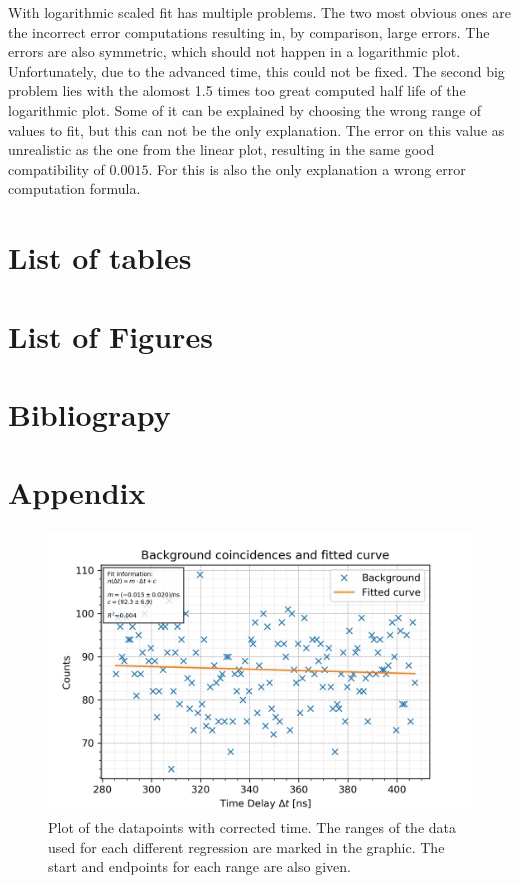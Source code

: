 \documentclass[30pt,a4paper]{article}
\begin{document}
 	With logarithmic scaled fit has multiple problems. The two most obvious ones are
 	the incorrect error computations resulting in, by comparison, large errors. The
 	errors are also symmetric, which should not happen in a logarithmic plot. 
 	Unfortunately, due to the advanced time, this could not be fixed.
 	The second big problem lies with the alomost 1.5 times too great computed half life of the logarithmic plot. Some of it can be explained by choosing the wrong range of values to fit, but this can not be the only explanation. The error on this value as unrealistic as the one from the linear plot, resulting in the same good compatibility of $0.0015$. For this is also the only explanation a wrong error computation formula. 
 	\section{List of tables}
 	\listoftables
 	\section{List of Figures}
 	\listoffigures
 	\section{Bibliograpy}
 		
 		
 	\section{Appendix}
 	
 	\begin{figure}[h]
 		\includegraphics{Bilder/lin_bkgnd}
 		\centering
 		\caption[Background with Fit]{\small Plot of the datapoints with corrected time. The ranges of the data used for each different regression are marked in the graphic. The start and endpoints for each range are also given.}
 		\label{bckgnd_fit}
 	\end{figure}
  
\end{document}
